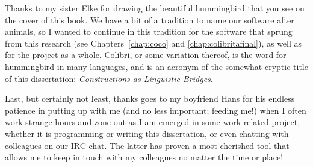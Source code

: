 Thanks to my sister Elke for drawing the beautiful hummingbird that you see on the cover of this book.  We have a bit of
a tradition to name our software after animals, so I wanted to continue in this tradition for the software that sprung
from this research (see Chapters~\ref{chap:coco} and \ref{chap:colibritafinal}), as well as for the project as a whole.
Colibri, or some variation thereof, is the word for hummingbird in many languages, and is an acronym of the somewhat
cryptic title of this dissertation: \emph{Constructions as Linguistic Bridges}.

Last, but certainly not least, thanks goes to my boyfriend Hans for his endless patience in putting up with
me (and no less important; feeding me!) when I often work strange hours and zone
out as I am emerged in some work-related project, whether it is programming or
writing this dissertation, or even chatting with colleagues on our IRC chat.
The latter has proven a most cherished tool that allows me to keep in touch
with my colleagues no matter the time or place!

